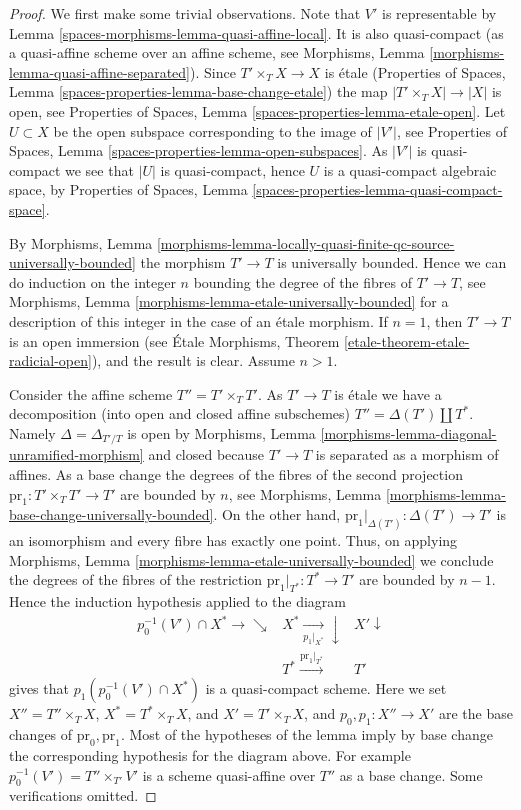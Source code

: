 \begin{proof}
We first make some trivial observations.
Note that $V'$ is representable by Lemma \ref{spaces-morphisms-lemma-quasi-affine-local}.
It is also quasi-compact (as a quasi-affine scheme over an affine scheme, see
Morphisms, Lemma \ref{morphisms-lemma-quasi-affine-separated}).
Since $T' \times_T X \to X$ is \'etale
(Properties of Spaces, Lemma \ref{spaces-properties-lemma-base-change-etale})
the map $|T' \times_T X| \to |X|$ is open, see
Properties of Spaces, Lemma \ref{spaces-properties-lemma-etale-open}.
Let $U \subset X$ be the open subspace corresponding to the image of
$|V'|$, see
Properties of Spaces, Lemma \ref{spaces-properties-lemma-open-subspaces}.
As $|V'|$ is quasi-compact we see that $|U|$ is quasi-compact, hence
$U$ is a quasi-compact algebraic space, by
Properties of Spaces, Lemma \ref{spaces-properties-lemma-quasi-compact-space}.

\medskip\noindent
By
Morphisms,
Lemma \ref{morphisms-lemma-locally-quasi-finite-qc-source-universally-bounded}
the morphism $T' \to T$ is universally bounded. Hence we can do induction on
the integer $n$ bounding the degree of the fibres of $T' \to T$, see
Morphisms, Lemma \ref{morphisms-lemma-etale-universally-bounded}
for a description of this integer in the case of an \'etale morphism.
If $n = 1$, then $T' \to T$ is an open immersion (see
\'Etale Morphisms, Theorem \ref{etale-theorem-etale-radicial-open}),
and the result is clear. Assume $n > 1$.

\medskip\noindent
Consider the affine scheme $T'' = T' \times_T T'$.
As $T' \to T$ is \'etale we have a decomposition (into open and closed affine
subschemes) $T'' = \Delta(T') \amalg T^*$. Namely $\Delta = \Delta_{T'/T}$
is open by
Morphisms, Lemma \ref{morphisms-lemma-diagonal-unramified-morphism}
and closed because $T' \to T$ is separated as a morphism of affines.
As a base change the degrees of the fibres of the second projection
$\text{pr}_1 : T' \times_T T' \to T'$ are bounded by $n$, see
Morphisms, Lemma \ref{morphisms-lemma-base-change-universally-bounded}.
On the other hand, $\text{pr}_1|_{\Delta(T')} : \Delta(T') \to T'$ is
an isomorphism and every fibre has exactly one point.
Thus, on applying
Morphisms, Lemma \ref{morphisms-lemma-etale-universally-bounded}
we conclude the degrees of the fibres of the restriction
$\text{pr}_1|_{T^*} : T^* \to T'$ are bounded by $n - 1$.
Hence the induction hypothesis applied to the diagram
$$
\begin{array}{ccc}p_0^{-1}(V') \cap X^* \longrightarrow\searrow & X^* \underset{p_1|_{X^*}}{\longrightarrow}\downarrow & X' \downarrow \\  & T^* \overset{\text{pr}_1|_{T^*}}{\longrightarrow} & T'\end{array}
$$
gives that $p_1(p_0^{-1}(V') \cap X^*)$
is a quasi-compact scheme. Here we set
$X'' = T'' \times_T X$, $X^* = T^* \times_T X$, and $X' = T' \times_T X$,
and $p_0, p_1 : X'' \to X'$ are the base changes of $\text{pr}_0, \text{pr}_1$.
Most of the hypotheses of the lemma imply
by base change the corresponding hypothesis for the diagram above.
For example $p_0^{-1}(V') = T'' \times_{T'} V'$
is a scheme quasi-affine over $T''$ as a base change. Some
verifications omitted.


\end{proof}
